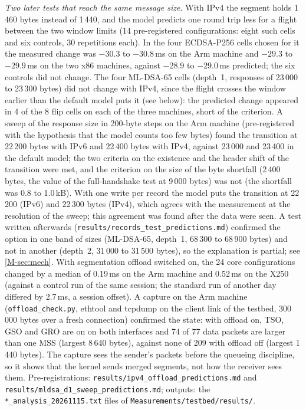\documentclass[preprint,12pt]{elsarticle}
\newcommand{\ms}{\,ms\xspace}
\begin{document}
\emph{Two later tests that reach the same message size.} With IPv4 the segment holds 1\,460 bytes instead of 1\,440, and the model predicts one round trip less for a flight between the two window limits (14 pre-registered configurations: eight such cells and six controls, 30 repetitions each). In the four ECDSA-P256 cells chosen for it the measured change was $-30.3$ to $-30.8$\ms on the Arm machine and $-29.3$ to $-29.9$\ms on the two x86 machines, against $-28.9$ to $-29.0$\ms predicted; the six controls did not change. The four ML-DSA-65 cells (depth~1, responses of 23\,000 to 23\,300 bytes) did not change with IPv4, since the flight crosses the window earlier than the default model puts it (see below): the predicted change appeared in 4 of the 8 flip cells on each of the three machines, short of the criterion. A sweep of the response size in 200-byte steps on the Arm machine (pre-registered with the hypothesis that the model counts too few bytes) found the transition at 22\,200 bytes with IPv6 and 22\,400 bytes with IPv4, against 23\,000 and 23\,400 in the default model; the two criteria on the existence and the header shift of the transition were met, and the criterion on the size of the byte shortfall (2\,400 bytes, the value of the full-handshake test at 9\,000 bytes) was not (the shortfall was 0.8 to 1.0\,kB). With one write per record the model puts the transition at 22\,200 (IPv6) and 22\,300 bytes (IPv4), which agrees with the measurement at the resolution of the sweep; this agreement was found after the data were seen. A test written afterwards (\texttt{results/records\_test\_predictions.md}) confirmed the option in one band of sizes (ML-DSA-65, depth~1, 68\,300 to 68\,900 bytes) and not in another (depth~2, 31\,000 to 31\,500 bytes), so the explanation is partial; see \cref{M-sec:mech}. With segmentation offload switched on, the 24 core configurations changed by a median of 0.19\ms on the Arm machine and 0.52\ms on the X250 (against a control run of the same session; the standard run of another day differed by 2.7\ms, a session offset). A capture on the Arm machine (\texttt{offload\_check.py}, ethtool and tcpdump on the client link of the testbed, 300\,000 bytes over a fresh connection) confirmed the state: with offload on, TSO, GSO and GRO are on on both interfaces and 74 of 77 data packets are larger than one MSS (largest 8\,640 bytes), against none of 209 with offload off (largest 1\,440 bytes). The capture sees the sender's packets before the queueing discipline, so it shows that the kernel sends merged segments, not how the receiver sees them. Pre-registrations: \texttt{results/ipv4\_\allowbreak offload\_\allowbreak predictions.md} and \texttt{results/mldsa\_\allowbreak d1\_\allowbreak sweep\_\allowbreak predictions.md}; outputs: the \texttt{*\_\allowbreak analysis\_\allowbreak 20261115.txt} files of \texttt{Measurements/testbed/results/}.
\end{document}
